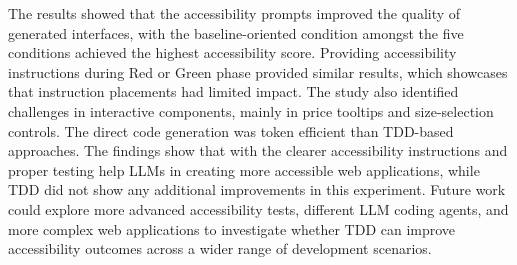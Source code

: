 \documentclass[conference]{IEEEtran}
\begin{document}
The results showed that the accessibility prompts improved the quality of generated interfaces, with the baseline-oriented condition amongst the five conditions achieved the highest accessibility score. Providing accessibility instructions during Red or Green phase provided similar results, which showcases that instruction placements had limited impact. The study also identified challenges in interactive components, mainly in price tooltips and size-selection controls. The direct code generation was token efficient than TDD-based approaches. The findings show that with the clearer accessibility instructions and proper testing help LLMs in creating more accessible web applications, while TDD did not show any additional improvements in this experiment. Future work could explore more advanced accessibility tests, different LLM coding agents, and more complex web applications to investigate whether TDD can improve accessibility outcomes across a wider range of development scenarios.
\end{document}
